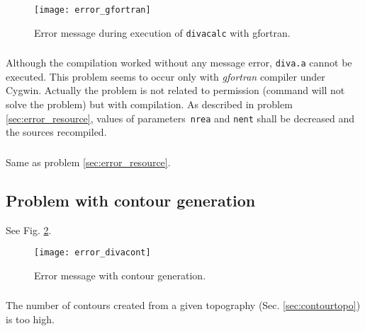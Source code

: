 \begin{figure}[htpb]
\centering
\texttt{[image: error\_gfortran]}
\caption{Error message during execution of \texttt{divacalc} with gfortran\label{fig:error_gfortran}.}
\end{figure}

\subsubsection{\question}

Although the compilation worked without any message error, \texttt{diva.a} cannot be executed. This problem seems to occur only with \textsl{gfortran} compiler under \textsf{Cygwin}. Actually the problem is not related to permission (command  will not solve the problem) but with compilation. As described in problem \ref{sec:error_resource}, values of parameters\, \texttt{nrea} and \texttt{nent} shall be decreased and the sources recompiled.

\subsubsection{\answer}

Same as problem \ref{sec:error_resource}. 




\subsection{Problem with contour generation}

See Fig. \ref{error:cont}.

\begin{figure}[htpb]
\centering
\texttt{[image: error\_divacont]}
\caption{Error message with contour generation.\label{error:cont}}
\end{figure}

\subsubsection{\question}

The number of contours created from a given topography (Sec. \ref{sec:contourtopo}) is too high. 

\subsubsection{\answer}

